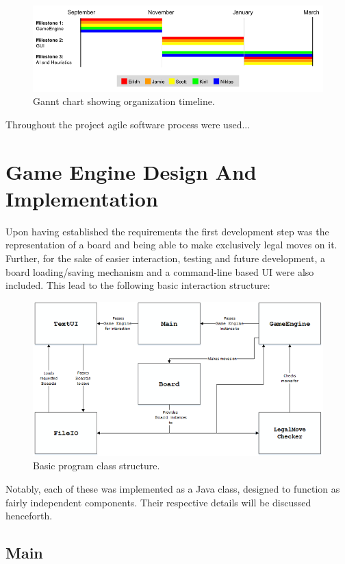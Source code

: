 \documentclass{l3proj}
\begin{document}
\begin{figure}[H]
\centering
\includegraphics[scale=0.5]{Images/GanntChart.png}
\caption{Gannt chart showing organization timeline.}
\end{figure}

Throughout the project agile software process were used...

\section{Game Engine Design And Implementation}

Upon having established the requirements the first development step was the representation of a board and being able to make exclusively legal moves on it. Further, for the sake of easier interaction, testing and future development, a board loading/saving mechanism and a command-line based UI were also included. This lead to the following basic interaction structure:

\begin{figure}[H]
\centering
\includegraphics[scale=1]{Images/S33Diagram.png}
\caption{Basic program class structure.}
\end{figure}

Notably, each of these was implemented as a Java class, designed to function as fairly independent components. Their respective details will be discussed henceforth.

\subsection{Main}
\end{document}
